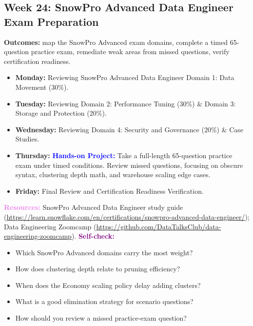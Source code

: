 \documentclass[11pt, a4paper]{article}
\newcommand{\project}[1]{\textbf{\textcolor{blue}{Hands-on Project:}} #1}
\newcommand{\dayitem}[2]{\item \textbf{#1:} #2}
\newcommand{\resources}[1]{\vspace{1mm}\noindent\textbf{\textcolor{violet}{Resources:}} #1}
\newcommand{\selfcheck}[1]{\vspace{1mm}\noindent\textbf{\textcolor{purple}{Self-check:}} #1}
\begin{document}
\subsection*{Week 24: SnowPro Advanced Data Engineer Exam Preparation}
\par\noindent\textbf{Outcomes:} map the SnowPro Advanced exam domains, complete a timed 65-question practice exam, remediate weak areas from missed questions, verify certification readiness.
\begin{itemize}[label=-]
    \dayitem{Monday}{Reviewing SnowPro Advanced Data Engineer Domain 1: Data Movement (30\%).}
    \dayitem{Tuesday}{Reviewing Domain 2: Performance Tuning (30\%) \& Domain 3: Storage and Protection (20\%).}
    \dayitem{Wednesday}{Reviewing Domain 4: Security and Governance (20\%) \& Case Studies.}
    \dayitem{Thursday}{\project{Take a full-length 65-question practice exam under timed conditions. Review missed questions, focusing on obscure syntax, clustering depth math, and warehouse scaling edge cases.}}
    \dayitem{Friday}{Final Review and Certification Readiness Verification.}
\end{itemize}
\resources{SnowPro Advanced Data Engineer study guide (\url{https://learn.snowflake.com/en/certifications/snowpro-advanced-data-engineer/}); Data Engineering Zoomcamp (\url{https://github.com/DataTalksClub/data-engineering-zoomcamp}).}
\selfcheck{\begin{itemize}[label=-, nosep, leftmargin=4mm]
    \item Which SnowPro Advanced domains carry the most weight?
    \item How does clustering depth relate to pruning efficiency?
    \item When does the Economy scaling policy delay adding clusters?
    \item What is a good elimination strategy for scenario questions?
    \item How should you review a missed practice-exam question?
\end{itemize}}
\end{document}
